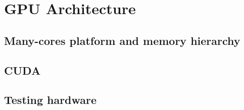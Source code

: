 \chapter{GPU Architecture}\label{ch:gpu}

\section{Many-cores platform and memory hierarchy}\label{sec:gpu_arch}

\section{CUDA}

\section{Testing hardware}\label{sec:benchmark}
